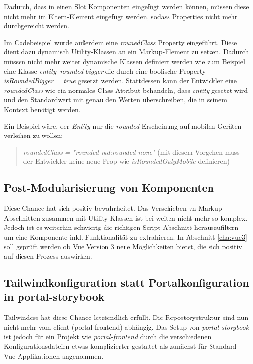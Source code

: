 Dadurch, dass in einen Slot Komponenten eingefügt werden können, müssen diese nicht mehr im Eltern-Element eingefügt werden, sodass Properties nicht mehr durchgereicht werden.



Im Codebeispiel wurde außerdem eine \textit{rounedClass} Property eingeführt. Diese dient dazu dynamisch Utility-Klassen an ein Markup-Element zu setzen. Dadurch müssen nicht mehr weiter dynamische Klassen definiert werden wie zum Beispiel eine Klasse \textit{entity--rounded-bigger} die durch eine boolische Property \textit{isRoundedBigger = true} gesetzt werden. Stattdessen kann der Entwickler eine \textit{roundedClass} wie ein normales Class Attribut behandeln, dass \textit{entity} gesetzt wird und den Standardwert mit genau den Werten überschreiben, die in seinem Kontext benötigt werden.

Ein Beispiel wäre, der \textit{Entity} nur die \textit{rounded} Erscheinung auf mobilen Geräten verleihen zu wollen: 

\begin{quotation}
	\textit{roundedClass = "rounded md:rounded-none"} (mit diesem Vorgehen muss der Entwickler keine neue Prop wie \textit{isRoundedOnlyMobile} definieren)
\end{quotation}

\subsection{Post-Modularisierung von Komponenten}
\label{subsec:postSplitting}
Diese Chance hat sich positiv bewahrheitet. Das Verschieben vn Markup-Abschnitten zusammen mit Utility-Klassen ist bei weiten nicht mehr so komplex. Jedoch ist es weiterhin schwierig die richtigen Script-Abschnitt herauszufiltern um eine Komponente inkl. Funktionalität zu extrahieren. In Abschnitt \ref{cha:vue3} soll geprüft werden ob Vue Version 3 neue Möglichkeiten bietet, die sich positiv auf diesen Prozess auswirken.

\subsection{Tailwindkonfiguration  statt  Portalkonfiguration  in  portal-storybook}
\label{subsec:tailwindConfVSPortalConf}
Tailwindcss hat diese Chance letztendlich erfüllt. Die Repostorystruktur sind nun nicht mehr vom client (portal-frontend) abhängig. Das Setup von \textit{portal-storybook} ist jedoch für ein Projekt wie \textit{portal-frontend} durch die verschiedenen Konfigurationsdateien etwas komplizierter gestaltet als zunächst für Standard-Vue-Applikationen angenommen.

